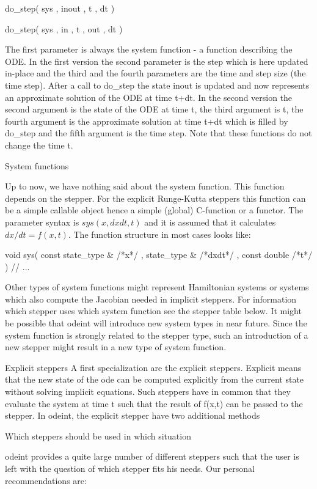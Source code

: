 do\_step( sys , inout , t , dt ) 

do\_step( sys , in , t , out , dt ) 

The first parameter is always the system function - a function describing the ODE. In the first version the second parameter is the step which is here updated in-place and the third and the fourth parameters are the time and step size (the time step). After a call to do\_step the state inout is updated and now represents an approximate solution of the ODE at time t+dt. In the second version the second argument is the state of the ODE at time t, the third argument is t, the fourth argument is the approximate solution at time t+dt which is filled by do\_step and the fifth argument is the time step. Note that these functions do not change the time t. 

System functions 

Up to now, we have nothing said about the system function. This function depends on the stepper. For the explicit Runge-Kutta steppers this function can be a simple callable object hence a simple (global) C-function or a functor. The parameter syntax is $sys( x , dxdt , t )$ and it is assumed that it calculates $dx/dt = f(x,t)$. The function structure in most cases looks like: 


void sys( const state\_type \& /*x*/ , state\_type \& /*dxdt*/ , const double /*t*/ )
{
    // ...
}


Other types of system functions might represent Hamiltonian systems or systems which also compute the Jacobian needed in implicit steppers. For information which stepper uses which system function see the stepper table below. It might be possible that odeint will introduce new system types in near future. Since the system function is strongly related to the stepper type, such an introduction of a new stepper might result in a new type of system function. 

Explicit steppers 
A first specialization are the explicit steppers. Explicit means that the new state of the ode can be computed explicitly from the current state without solving implicit equations. Such steppers have in common that they evaluate the system at time t such that the result of f(x,t) can be passed to the stepper. In odeint, the explicit stepper have two additional methods 


Which steppers should be used in which situation 

odeint provides a quite large number of different steppers such that the user is left with the question of which stepper fits his needs. Our personal recommendations are: 

